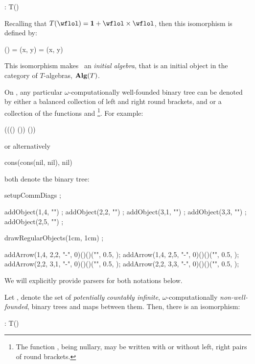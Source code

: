 \placesubformula\startformula
  \alpha : T(\wflol) \longRightIsoArrow \wflol
\stopformula

\noindent Recalling that $T(\wflol) = \bold{1} + \wflol \times \wflol$, 
then this isomorphism is defined by: 

\placeformula[+]\startformula\startalign
  \NC \alpha(\star) \NC =         \NR
  \NC \alpha(x, y)  \NC = (x, y) \NR
\stopalign\stopformula

\noindent This isomorphism makes \wflol\ an \emph{initial algebra}, 
that is an initial object in the category of $T$-algebras, 
$\bold{Alg}(T)$.

On , any particular $\omega$-computationally well-founded 
binary tree can be denoted by either a balanced collection of left and 
right round brackets, \quote{(} and \quote{)} or a collection of the 
functions  and \footnote{The function , 
being nullary, may be written with or without left, right pairs of round 
brackets.}. For example: 

\placeformula[+]\startformula\starttyping
((() ()) ())
\stoptyping\stopformula

\noindent or alternatively 

\placeformula[+]\startformula\starttyping
cons(cons(nil, nil), nil)
\stoptyping\stopformula

\noindent both denote the binary tree:

\placeformula[+]\startformula{}
  setupCommDiags ;
  
  addObject(1,4, "") ;
  addObject(2,2, "") ;
  addObject(3,1, "") ;
  addObject(3,3, "") ;
  addObject(2,5, "") ;
  
  drawRegularObjects(1cm, 1cm) ;
  
  addArrow(1,4, 2,2, "-", 0)()()("", 0.5, );
  addArrow(1,4, 2,5, "-", 0)()()("", 0.5, );
  addArrow(2,2, 3,1, "-", 0)()()("", 0.5, );
  addArrow(2,2, 3,3, "-", 0)()()("", 0.5, );

\stopMPcode\stopformula

\noindent We will explicitly provide parsers for both notations below. 

Let \lol, denote the set of \emph{potentially} \emph{countably infinite}, 
$\omega$-computationally \emph{non-well-founded}, binary trees and maps 
between them. Then, there is an isomorphism: 

\placesubformula\startformula
  \zeta : \lol \longRightIsoArrow T(\lol)
\stopformula

